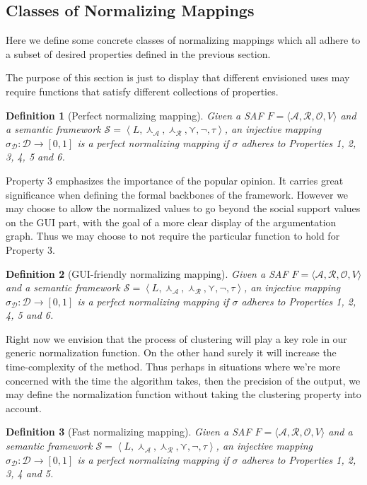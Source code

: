 \documentclass{article}
\newtheorem{definition}{Definition}
\newcommand{\args}{\mathcal{A}} %
\newcommand{\att}{\mathcal{R}}  %
\newcommand{\valueset}{L}
\newcommand{\obj}{\mathcal{O}} %
\newcommand{\safid}{F}               %
\newcommand{\safbodyO}{\langle \args, \att, \obj, V \rangle} %
\newcommand{\safO}{\safid = \safbodyO} %
\newcommand{\sembodyNew}{\left\langle \valueset,\SAFand_\mathcal{A}, \SAFand_\mathcal{R},\SAFor,\lnot,\tau \right\rangle} %
\newcommand{\SAFand}{\curlywedge}     %
\newcommand{\SAFor}{\curlyvee}        %
\newcommand{\sem}{\mathcal{S}}
\newcommand{\dataset}{\mathcal{D}}   %
\begin{document}
\subsection{Classes of Normalizing Mappings}

Here we define some concrete classes of normalizing mappings which all adhere to a subset of desired properties defined in the previous section. 

The purpose of this section is just to display that different envisioned uses may require functions that satisfy different collections of properties. 

\begin{definition} [Perfect normalizing mapping] Given a SAF $\safO$ and a semantic framework $\sem = \sembodyNew$,  an injective mapping $\sigma_{\dataset}: \dataset  \rightarrow  [0,1]$ is a perfect normalizing mapping if $\sigma$ adheres to Properties 1, 2, 3, 4, 5 and 6.
\end{definition}

Property 3 emphasizes the importance of the popular opinion. It carries great significance when defining the formal backbones of the framework. However we may choose to allow the normalized values to go beyond the social support values on the GUI part, with the goal of a more clear display of the argumentation graph. Thus we may choose to not require the particular function to hold for Property 3.

\begin{definition} [GUI-friendly normalizing mapping] Given a SAF $\safO$ and a semantic framework $\sem = \sembodyNew$,  an injective mapping $\sigma_{\dataset}: \dataset  \rightarrow  [0,1]$ is a perfect normalizing mapping if $\sigma$ adheres to Properties 1, 2, 4, 5 and 6.
\end{definition}

Right now we envision that the process of clustering will play a key role in our generic normalization function. On the other hand surely it will increase the time-complexity of the method. Thus perhaps in situations where we're more concerned with the time the algorithm takes, then the precision of the output, we may define the normalization function without taking the clustering property into account.

\begin{definition}[Fast normalizing mapping] Given a SAF $\safO$ and a semantic framework $\sem = \sembodyNew$,  an injective mapping $\sigma_{\dataset}: \dataset  \rightarrow  [0,1]$ is a perfect normalizing mapping if $\sigma$ adheres to Properties 1, 2, 3, 4 and 5.
\end{definition}

\end{document}
